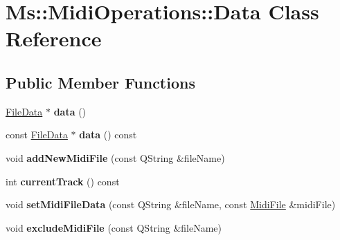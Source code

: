 \hypertarget{class_ms_1_1_midi_operations_1_1_data}{}\section{Ms\+:\+:Midi\+Operations\+:\+:Data Class Reference}
\label{class_ms_1_1_midi_operations_1_1_data}
\subsection*{Public Member Functions}
\begin{DoxyCompactItemize}
\item 
\mbox{\label{class_ms_1_1_midi_operations_1_1_data_ab5a92bba20772935662f6f4cfa481975}} 
\hyperlink{struct_ms_1_1_midi_operations_1_1_file_data}{File\+Data} $\ast$ {\bfseries data} ()
\item 
\mbox{\label{class_ms_1_1_midi_operations_1_1_data_ac054a6e1fd3a986ea066424bad2ceeab}} 
const \hyperlink{struct_ms_1_1_midi_operations_1_1_file_data}{File\+Data} $\ast$ {\bfseries data} () const
\item 
\mbox{\label{class_ms_1_1_midi_operations_1_1_data_aedd86b55a65095903c7183c781e3afb6}} 
void {\bfseries add\+New\+Midi\+File} (const Q\+String \&file\+Name)
\item 
\mbox{\label{class_ms_1_1_midi_operations_1_1_data_ab0613fb77262a46478f43b0acb89d27e}} 
int {\bfseries current\+Track} () const
\item 
\mbox{\label{class_ms_1_1_midi_operations_1_1_data_a4ac456691588f1bbe2cd7ded063a05c2}} 
void {\bfseries set\+Midi\+File\+Data} (const Q\+String \&file\+Name, const \hyperlink{class_ms_1_1_midi_file}{Midi\+File} \&midi\+File)
\item 
\mbox{\label{class_ms_1_1_midi_operations_1_1_data_a63072136b16762786c18995618b0487b}} 
void {\bfseries exclude\+Midi\+File} (const Q\+String \&file\+Name)
\item 
\mbox{\label{class_ms_1_1_midi_operations_1_1_data_aa676719a641eb3b565219a1f8546c3c7}} 

\end{DoxyCompactItemize}
